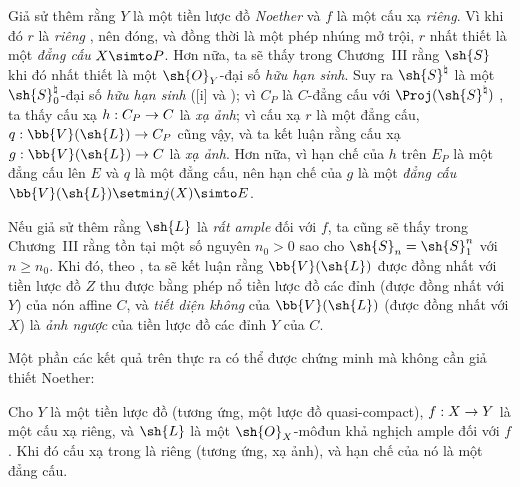 \documentclass[oneside,10pt]{amsart}
\makeatletter
\renewcommand{\geq}{\geqslant}
\newcommand{\ega@arrow}[2]{\mathchoice{#1}{#2}{#2}{#2}}
\renewcommand{\to}{\ega@arrow{\longrightarrow}{\rightarrow}}
\let\EGAOriginalLabel\label
\renewcommand{\label}[1]{\phantomsection\EGAOriginalLabel{#1}}
\makeatother
\begin{document}
\begin{remark}[8.8.3]
\label{II.8.8.3}
Giả sử thêm rằng $Y$ là một tiền lược đồ \emph{Noether} và $f$ là một cấu xạ \emph{riêng}.
Vì khi đó $r$ là \emph{riêng} , nên đóng, và đồng thời là một phép nhúng mở trội, $r$ nhất thiết là một \emph{đẳng cấu} $X\simto P$.
Hơn nữa, ta sẽ thấy trong Chương~III  rằng $\sh{S}$ khi đó nhất thiết là một $\sh{O}_Y$-đại số \emph{hữu hạn sinh}.
Suy ra $\sh{S}^\natural$ là một $\sh{S}_0^\natural$-đại số \emph{hữu hạn sinh} ([i] và );
vì $C_P$ là $C$-đẳng cấu với $\Proj(\sh{S}^\natural)$ , ta thấy cấu xạ $h:C_P\to C$ là \emph{xạ ảnh};
vì cấu xạ $r$ là một đẳng cấu, $q:\bb{V}(\sh{L})\to C_P$ cũng vậy, và ta kết luận rằng cấu xạ $g:\bb{V}(\sh{L})\to C$ là \emph{xạ ảnh}.
Hơn nữa, vì hạn chế của $h$ trên $E_P$ là một đẳng cấu lên $E$ và $q$ là một đẳng cấu, nên hạn chế  của $g$ là một \emph{đẳng cấu} $\bb{V}(\sh{L})\setmin j(X)\simto E$.

Nếu giả sử thêm rằng $\sh{L}$ là \emph{rất ample} đối với $f$, ta cũng sẽ thấy trong Chương~III  rằng tồn tại một số nguyên $n_0>0$ sao cho $\sh{S}_n=\sh{S}_1^n$ với $n\geq n_0$.
Khi đó, theo , ta sẽ kết luận rằng $\bb{V}(\sh{L})$ được đồng nhất với tiền lược đồ $Z$ thu được bằng phép nổ tiền lược đồ các đỉnh (được đồng nhất với $Y$) của nón affine $C$,
và \emph{tiết diện không} của $\bb{V}(\sh{L})$ (được đồng nhất với $X$) là \emph{ảnh ngược} của tiền lược đồ các đỉnh $Y$ của $C$.

Một phần các kết quả trên thực ra có thể được chứng minh mà không cần giả thiết Noether:
\end{remark}
\begin{corollary}[8.8.4]
\label{II.8.8.4}
Cho $Y$ là một tiền lược đồ (tương ứng, một lược đồ quasi-compact), $f:X\to Y$ là một cấu xạ riêng, và $\sh{L}$ là một $\sh{O}_X$-môđun khả nghịch ample đối với $f$.
Khi đó cấu xạ trong  là riêng (tương ứng, xạ ảnh), và hạn chế  của nó là một đẳng cấu.
\end{corollary}
\end{document}
